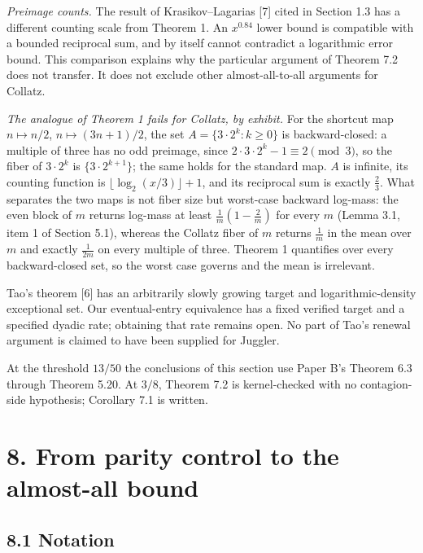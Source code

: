 \documentclass[11pt,a4paper]{article}
\begin{document}
\emph{Preimage counts.} The result of Krasikov--Lagarias {[}7{]} cited
in Section 1.3 has a different counting scale from Theorem 1. An
\(x^{0.84}\) lower bound is compatible with a bounded reciprocal sum,
and by itself cannot contradict a logarithmic error bound. This
comparison explains why the particular argument of Theorem 7.2 does not
transfer. It does not exclude other almost-all-to-all arguments for
Collatz.

\emph{The analogue of Theorem 1 fails for Collatz, by exhibit.} For the
shortcut map \(n\mapsto n/2\), \(n\mapsto(3n+1)/2\), the set
\(A=\{3\cdot2^k:k\ge0\}\) is backward-closed: a multiple of three has no
odd preimage, since \(2\cdot3\cdot2^k-1\equiv2\pmod3\), so the fiber of
\(3\cdot2^k\) is \(\{3\cdot2^{k+1}\}\); the same holds for the standard
map. \(A\) is infinite, its counting function is
\(\lfloor\log_2(x/3)\rfloor+1\), and its reciprocal sum is exactly
\(\tfrac23\). What separates the two maps is not fiber size but
worst-case backward log-mass: the even block of \(m\) returns log-mass
at least \(\tfrac1m(1-\tfrac2m)\) for every \(m\) (Lemma 3.1, item 1 of
Section 5.1), whereas the Collatz fiber of \(m\) returns \(\tfrac1m\) in
the mean over \(m\) and exactly \(\tfrac1{2m}\) on every multiple of
three. Theorem 1 quantifies over every backward-closed set, so the worst
case governs and the mean is irrelevant.

Tao's theorem {[}6{]} has an arbitrarily slowly growing target and
logarithmic-density exceptional set. Our eventual-entry equivalence has
a fixed verified target and a specified dyadic rate; obtaining that rate
remains open. No part of Tao's renewal argument is claimed to have been
supplied for Juggler.

At the threshold \(13/50\) the conclusions of this section use Paper B's
Theorem 6.3 through Theorem 5.20. At \(3/8\), Theorem 7.2 is
kernel-checked with no contagion-side hypothesis; Corollary 7.1 is
written.

\section{8. From parity control to the almost-all
bound}\label{from-parity-control-to-the-almost-all-bound}

\subsection{8.1 Notation}\label{notation}
\end{document}
